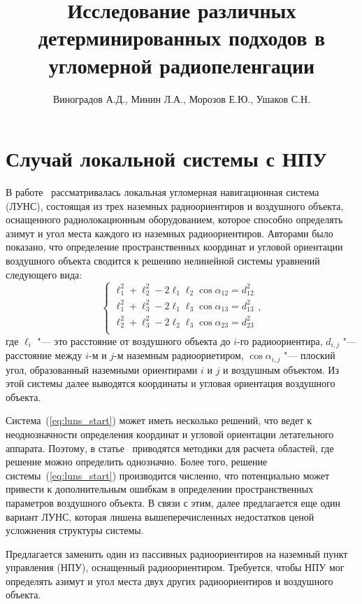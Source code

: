 \documentclass[a4paper,12pt]{article}
\author{Виноградов А.Д., Минин Л.А., Морозов Е.Ю., Ушаков С.Н.}
\title{Исследование различных детерминированных подходов в угломерной радиопеленгации}
\date{}
\begin{document}
\maketitle

\section{Случай локальной системы с НПУ}
В работе~\cite{antennas} рассматривалась локальная угломерная навигационная система (ЛУНС),
состоящая из трех наземных радиоориентиров и воздушного объекта, оснащенного радиолокационным
оборудованием, которое способно определять азимут и угол места каждого из наземных радиоориентиров.
Авторами было показано, что определение пространственных координат и угловой ориентации воздушного
объекта сводится к решению нелинейной системы уравнений следующего вида:
\begin{equation}\label{eq:luns_start}
    \begin{cases}
        \ell_1^2 + \ell_2^2 - 2 \ell_1 \ell_2 \cos \alpha_{12} = d_{12}^2 \\
        \ell_1^2 + \ell_3^2 - 2 \ell_1 \ell_3 \cos \alpha_{13} = d_{13}^2 \\
        \ell_2^2 + \ell_3^2 - 2 \ell_2 \ell_3 \cos \alpha_{23} = d_{23}^2 \\
    \end{cases},
\end{equation}
где $\ell_i$ "--- это расстояние от воздушного объекта до $i$-го радиоориентира, $d_{i,j}$
"--- расстояние между $i$-м и $j$-м наземным радиоориетиром, $\cos \alpha_{i,j}$ "---
плоский угол, образованный наземными ориентирами $i$ и $j$ и воздушным объектом. Из этой
системы далее выводятся координаты и угловая ориентация воздушного объекта.

Система~(\ref{eq:luns_start}) может иметь несколько решений, что ведет к неоднозначности определения
координат и угловой ориентации летательного аппарата. Поэтому, в статье~\cite{antennas} приводятся
методики для расчета областей, где решение можно определить однозначно. Более того, решение системы~(\ref{eq:luns_start})
производится численно, что потенциально может привести к дополнительным ошибкам в определении
пространственных параметров воздушного объекта. В связи с этим, далее предлагается еще один
вариант ЛУНС, которая лишена вышеперечисленных недостатков ценой усложнения структуры системы.

Предлагается заменить один из пассивных радиоориентиров на наземный пункт управления (НПУ), оснащенный
радиоориентиром. Требуется, чтобы НПУ мог определять азимут и угол места двух других радиоориентиров
и воздушного объекта.
\end{document}

